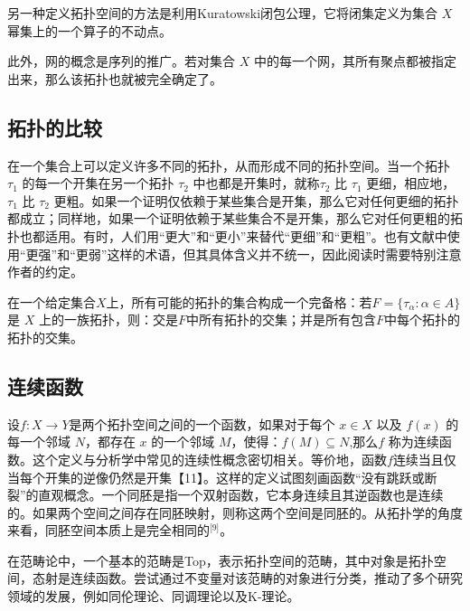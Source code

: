 另一种定义拓扑空间的方法是利用Kuratowski闭包公理，它将闭集定义为集合 $X$ 幂集上的一个算子的不动点。

此外，网的概念是序列的推广。若对集合 $X$ 中的每一个网，其所有聚点都被指定出来，那么该拓扑也就被完全确定了。
\subsection{拓扑的比较}
在一个集合上可以定义许多不同的拓扑，从而形成不同的拓扑空间。当一个拓扑 $\tau_1$ 的每一个开集在另一个拓扑 $\tau_2$ 中也都是开集时，就称$\tau_2$ 比 $\tau_1$ 更细，相应地，$\tau_1$ 比 $\tau_2$ 更粗。如果一个证明仅依赖于某些集合是开集，那么它对任何更细的拓扑都成立；同样地，如果一个证明依赖于某些集合不是开集，那么它对任何更粗的拓扑也都适用。有时，人们用“更大”和“更小”来替代“更细”和“更粗”。也有文献中使用“更强”和“更弱”这样的术语，但其具体含义并不统一，因此阅读时需要特别注意作者的约定。

在一个给定集合$X$上，所有可能的拓扑的集合构成一个完备格：若$F = \{\tau_\alpha : \alpha \in A\}$是 $X$ 上的一族拓扑，则：交是$F$中所有拓扑的交集；并是所有包含$F$中每个拓扑的拓扑的交集。
\subsection{连续函数}
设$f: X \to Y$是两个拓扑空间之间的一个函数，如果对于每个 $x \in X$ 以及 $f(x)$ 的每一个邻域 $N$，都存在 $x$ 的一个邻域 $M$，使得：$f(M) \subseteq N$,那么$f$ 称为连续函数。这个定义与分析学中常见的连续性概念密切相关。等价地，函数$f$连续当且仅当每个开集的逆像仍然是开集【11】。这样的定义试图刻画函数“没有跳跃或断裂”的直观概念。一个同胚是指一个双射函数，它本身连续且其逆函数也是连续的。如果两个空间之间存在同胚映射，则称这两个空间是同胚的。从拓扑学的角度来看，同胚空间本质上是完全相同的\(^\text{[9]}\)。

在范畴论中，一个基本的范畴是Top，表示拓扑空间的范畴，其中对象是拓扑空间，态射是连续函数。尝试通过不变量对该范畴的对象进行分类，推动了多个研究领域的发展，例如同伦理论、同调理论以及K-理论。
